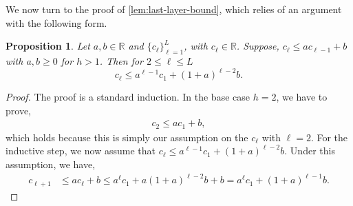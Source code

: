 \documentclass[twoside]{article}
\newcommand{\R}{\mathbb{R}}
\theoremstyle{theoremstyle}
\newtheorem{proposition}[theorem]{Proposition}
\begin{document}
We now turn to the proof of \cref{lem:last-layer-bound}, which relies of an argument with the following form.

\begin{proposition}\label{prop:recursion}
    Let $a, b\in \R$ and $\{c_\ell\}_{\ell=1}^L$, with $c_\ell \in \R$. Suppose, $c_\ell \le a c_{\ell-1} + b$ with $a, b \ge 0$ for $h > 1$.
    Then for $2 \leq \ell \leq L$
    \begin{equation}
        c_\ell \le a^{\ell - 1} c_1 + (1 + a)^{\ell - 2} b.
    \end{equation}
\end{proposition}
\begin{proof}
    The proof is a standard induction. In the base case $h=2$, we have to prove,
    \begin{align}
        c_2 \leq a c_1 + b,
    \end{align}
which holds because this is simply our assumption on the $c_\ell$ with $\ell=2$. For the inductive step, we now assume that $c_\ell \leq a^{\ell - 1} c_1 + (1 + a)^{\ell - 2} b$. Under this assumption, we have,
\begin{align}
    c_{\ell+1} &\leq  a c_{\ell} + b 
     \leq a^{\ell} c_1 + a(1 + a)^{\ell - 2} b + b 
     = a^{\ell} c_1 + (1 + a)^{\ell - 1} b.
\end{align}
\end{proof}
\end{document}
